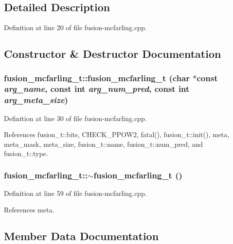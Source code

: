 \subsection{Detailed Description}


Definition at line 20 of file fusion-mcfarling.cpp.

\subsection{Constructor \& Destructor Documentation}
\subsubsection[{fusion\_\-mcfarling\_\-t}]{\setlength{\rightskip}{0pt plus 5cm}fusion\_\-mcfarling\_\-t::fusion\_\-mcfarling\_\-t (char $\ast$const  {\em arg\_\-name}, \/  const int {\em arg\_\-num\_\-pred}, \/  const int {\em arg\_\-meta\_\-size})\hspace{0.3cm}{\tt  [inline]}}\label{classfusion__mcfarling__t_0afadbbb9fe390612e1e68d47e71850c}




Definition at line 30 of file fusion-mcfarling.cpp.

References fusion\_\-t::bits, CHECK\_\-PPOW2, fatal(), fusion\_\-t::init(), meta, meta\_\-mask, meta\_\-size, fusion\_\-t::name, fusion\_\-t::num\_\-pred, and fusion\_\-t::type.
\subsubsection[{$\sim$fusion\_\-mcfarling\_\-t}]{\setlength{\rightskip}{0pt plus 5cm}fusion\_\-mcfarling\_\-t::$\sim$fusion\_\-mcfarling\_\-t ()\hspace{0.3cm}{\tt  [inline]}}\label{classfusion__mcfarling__t_dc0597f1e944e971d6d717a96b798786}




Definition at line 59 of file fusion-mcfarling.cpp.

References meta.

\subsection{Member Data Documentation}
